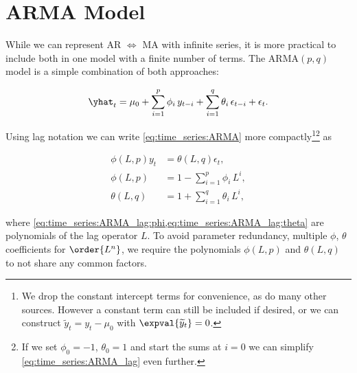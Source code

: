 \section{ARMA Model}
\label{time_series:ARMA}

While we can represent AR $\Leftrightarrow$ MA with infinite series,
it is more practical to include both in one model with a finite number of terms.
The $\text{ARMA}\left(p,q\right)$ model is a simple combination of
both approaches:

\begin{equation}\label{eq:time_series:ARMA}
\yhat_{t} = \mu_{0} + \sum_{i=1}^{p} \phi_{i}\, y_{t-i} + \sum_{i=1}^{q} \theta_{i}\, \epsilon_{t-i} + \epsilon_{t}.
\end{equation}

Using lag notation we can write \cref{eq:time_series:ARMA} more
compactly\footnote{We drop
the constant intercept terms for convenience, as do many other sources.
However a constant term can still be included if desired,
or we can construct $\widetilde{y}_{t} = y_{t} - \mu_{0}$ with $\expval{\widetilde{y}_{t}} = 0$.}\footnote{If we set
$\phi_{0}=-1$, $\theta_{0} = 1$ and start the sums at $i=0$
we can simplify \cref{eq:time_series:ARMA_lag} even further.} as

\begin{subequations}\label{eq:time_series:ARMA_lag}
\begin{align}
\phi\left(L,p\right) y_{t} &= \theta\left(L,q\right) \epsilon_{t}, \label{eq:time_series:ARMA_lag:def} \\
\phi\left(L,p\right) &= 1 - \sum_{i=1}^{p} \phi_{i}\, L^{i}, \label{eq:time_series:ARMA_lag:phi} \\
\theta\left(L,q\right) &= 1 + \sum_{i=1}^{q} \theta_{i}\, L^{i}, \label{eq:time_series:ARMA_lag:theta}
\end{align}
\end{subequations}

\noindent where \cref{eq:time_series:ARMA_lag:phi,eq:time_series:ARMA_lag:theta} are polynomials of the lag operator $L$.
To avoid parameter redundancy, \ie multiple $\phi$, $\theta$ coefficients for $\order{L^{n}}$,
we require the polynomials $\phi\left(L,p\right)$ and $\theta\left(L,q\right)$ to not share any common factors.

